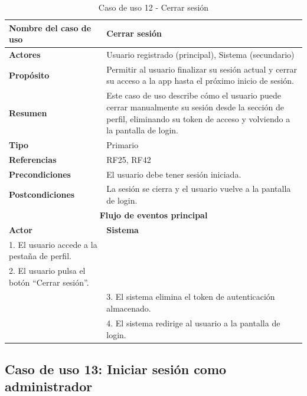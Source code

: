 \begin{table}[H]
\centering
\caption{Caso de uso 12 - Cerrar sesión}
\begin{tabular}{|p{4.5cm}|p{10.5cm}|}
\hline
\textbf{Nombre del caso de uso} & Cerrar sesión \\
\hline
\textbf{Actores} & Usuario registrado (principal), Sistema (secundario) \\
\hline
\textbf{Propósito} & Permitir al usuario finalizar su sesión actual y cerrar su acceso a la app hasta el próximo inicio de sesión. \\
\hline
\textbf{Resumen} & Este caso de uso describe cómo el usuario puede cerrar manualmente su sesión desde la sección de perfil, eliminando su token de acceso y volviendo a la pantalla de login. \\
\hline
\textbf{Tipo} & Primario \\
\hline
\textbf{Referencias} & RF25, RF42 \\
\hline
\textbf{Precondiciones} & El usuario debe tener sesión iniciada. \\
\hline
\textbf{Postcondiciones} & La sesión se cierra y el usuario vuelve a la pantalla de login. \\
\hline
\multicolumn{2}{|c|}{\textbf{Flujo de eventos principal}} \\
\hline
\textbf{Actor} & \textbf{Sistema} \\
\hline
1. El usuario accede a la pestaña de perfil. & \\
\hline
2. El usuario pulsa el botón “Cerrar sesión”. & \\
\hline
& 3. El sistema elimina el token de autenticación almacenado. \\
\hline
& 4. El sistema redirige al usuario a la pantalla de login. \\
\hline
\end{tabular}
\end{table}


\subsection{Caso de uso 13: Iniciar sesión como administrador}

